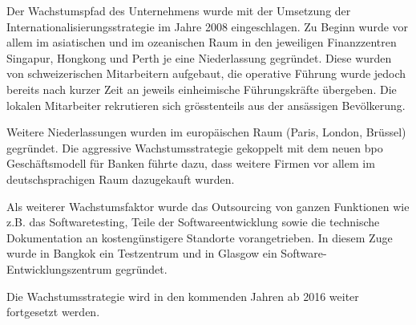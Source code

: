 \begin{sloppypar}
Der Wachstumspfad des Unternehmens wurde mit der Umsetzung der Internationalisierungsstrategie im Jahre 2008 eingeschlagen. Zu Beginn wurde vor allem im asiatischen und im ozeanischen Raum in den jeweiligen Finanzzentren Singapur, Hongkong und Perth je eine Niederlassung gegründet. Diese wurden von schweizerischen Mitarbeitern aufgebaut, die operative Führung wurde jedoch bereits nach kurzer Zeit an jeweils einheimische Führungskräfte übergeben. Die lokalen Mitarbeiter rekrutieren sich grösstenteils aus der ansässigen Bevölkerung.
\end{sloppypar}

\begin{sloppypar}
Weitere Niederlassungen wurden im europäischen Raum (Paris, London, Brüssel) gegründet. Die aggressive Wachstumsstrategie gekoppelt mit dem neuen \acrfull{bpo} Geschäftsmodell für Banken führte dazu, dass weitere Firmen vor allem im deutschsprachigen Raum dazugekauft wurden.
\end{sloppypar}

\begin{sloppypar}
Als weiterer Wachstumsfaktor wurde das Outsourcing von ganzen Funktionen wie z.B. das Softwaretesting, Teile der Softwareentwicklung sowie die technische Dokumentation an kostengünstigere Standorte vorangetrieben. In diesem Zuge wurde in Bangkok ein Testzentrum und in Glasgow ein Software-Entwicklungszentrum gegründet.
\end{sloppypar}

\begin{sloppypar}
Die Wachstumsstrategie wird in den kommenden Jahren ab 2016 weiter fortgesetzt werden.
\end{sloppypar}